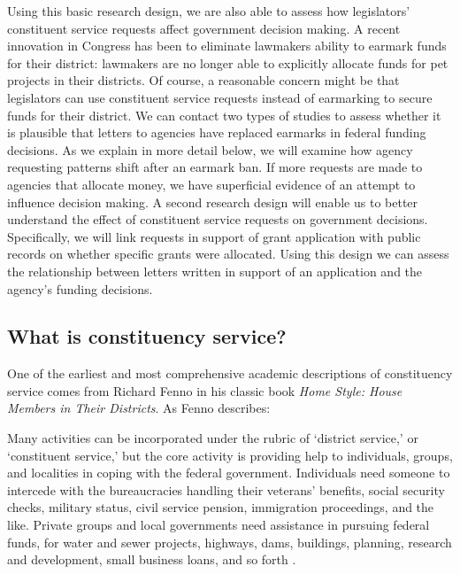 \documentclass{article}
\begin{document}
Using this basic research design, we are also able to assess how legislators' constituent service requests affect government decision making.  A recent innovation in Congress has been to eliminate lawmakers ability to earmark funds for their district: lawmakers are no longer able to explicitly allocate funds for pet projects in their districts.  Of course, a reasonable concern might be that legislators can use constituent service requests instead of earmarking to secure funds for their district.  We can contact two types of studies to assess whether it is plausible that letters to agencies have replaced earmarks in federal funding decisions.  As we explain in more detail below, we will examine how agency requesting patterns shift after an earmark ban. If more requests are made to agencies that allocate money, we have superficial evidence of an attempt to influence decision making.  A second research design will enable us to better understand the effect of constituent service requests on government decisions.  Specifically, we will link requests in support of grant application with public records on whether specific grants were allocated.  Using this design we can assess the relationship between letters written in support of an application and the agency's funding decisions.  

\subsection{What is constituency service?}

One of the earliest and most comprehensive academic descriptions of constituency service comes from Richard Fenno in his classic book \emph{Home Style: House Members in Their Districts}. As Fenno describes:

\begin{displayquote}
Many activities can be incorporated under the rubric of `district service,' or `constituent service,' but the core activity is providing help to individuals, groups, and localities in coping with the federal government.  Individuals need someone to intercede with the bureaucracies handling their veterans' benefits, social security checks, military status, civil service pension, immigration proceedings, and the like.  Private groups and local governments need assistance in pursuing federal funds, for water and sewer projects, highways, dams, buildings, planning, research and development, small business loans, and so forth \citep[pg. 101]{Fenno1978}.
\end{displayquote}
\end{document}
